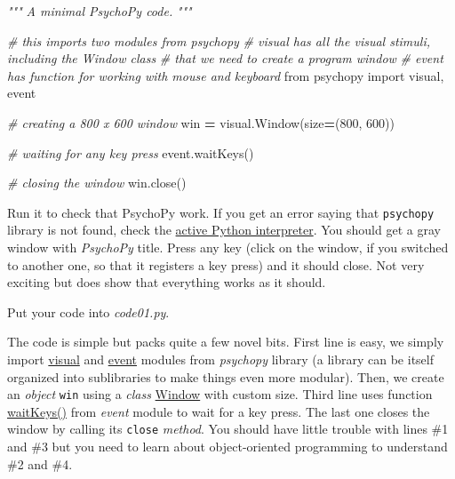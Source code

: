\documentclass[
]{book}
\newenvironment{Shaded}{\begin{snugshade}}{\end{snugshade}}
\newcommand{\CommentTok}[1]{\textcolor[rgb]{0.56,0.35,0.01}{\textit{#1}}}
\newcommand{\DecValTok}[1]{\textcolor[rgb]{0.00,0.00,0.81}{#1}}
\newcommand{\ImportTok}[1]{#1}
\newcommand{\NormalTok}[1]{#1}
\newcommand{\OperatorTok}[1]{\textcolor[rgb]{0.81,0.36,0.00}{\textbf{#1}}}
\begin{document}
\begin{Shaded}
\begin{Highlighting}[]
\CommentTok{"""}
\CommentTok{A minimal PsychoPy code.}
\CommentTok{"""}

\CommentTok{\# this imports two modules from psychopy}
\CommentTok{\# visual has all the visual stimuli, including the Window class}
\CommentTok{\# that we need to create a program window}
\CommentTok{\# event has function for working with mouse and keyboard}
\ImportTok{from}\NormalTok{ psychopy }\ImportTok{import}\NormalTok{ visual, event}

\CommentTok{\# creating a 800 x 600 window}
\NormalTok{win }\OperatorTok{=}\NormalTok{ visual.Window(size}\OperatorTok{=}\NormalTok{(}\DecValTok{800}\NormalTok{, }\DecValTok{600}\NormalTok{))}

\CommentTok{\# waiting for any key press}
\NormalTok{event.waitKeys()}

\CommentTok{\# closing the window}
\NormalTok{win.close()}
\end{Highlighting}
\end{Shaded}

Run it to check that PsychoPy work. If you get an error saying that \texttt{psychopy} library is not found, check the \protect\hyperlink{install-vs-code}{active Python interpreter}. You should get a gray window with \emph{PsychoPy} title. Press any key (click on the window, if you switched to another one, so that it registers a key press) and it should close. Not very exciting but does show that everything works as it should.

Put your code into \emph{code01.py}.

The code is simple but packs quite a few novel bits. First line is easy, we simply import \href{https://psychopy.org/api/visual/index.html}{visual} and \href{https://psychopy.org/api/event.html}{event} modules from \emph{psychopy} library (a library can be itself organized into sublibraries to make things even more modular). Then, we create an \emph{object} \texttt{win} using a \emph{class} \href{https://psychopy.org/api/visual/window.html\#psychopy.visual.Window}{Window} with custom size. Third line uses function \href{https://psychopy.org/api/event.html\#psychopy.event.waitKeys}{waitKeys()} from \emph{event} module to wait for a key press. The last one closes the window by calling its \texttt{close} \emph{method}. You should have little trouble with lines \#1 and \#3 but you need to learn about object-oriented programming to understand \#2 and \#4.
\end{document}
